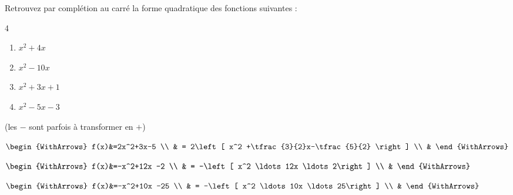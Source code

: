 \documentclass[main.tex]{subfiles}
\begin{document}
\begin{exercise}\label{chapitre01:exercice:completioncarre:01} Retrouvez par complétion au carré la forme quadratique des fonctions suivantes :
\vspace{-1em}
\begin{multicols}{4} 
	\begin{enumerate}[label={$f_\arabic*(x)=$\rule{0pt}{1.8em}}, leftmargin=*] 
		\item $x^2+4x$  
		\item $x^2-10x$  
		\item $x^2+3x+1$  
		\item $x^2-5x-3$  
	\end{enumerate}
\end{multicols} 
\end{exercise}
\begin{example}(les $-$ sont parfois à transformer en $+$)\hfill

\noindent
\parbox{0.35\linewidth}{
	\noindent
	$\begin{WithArrows}
		f(x)&=2x^2+3x-5 \\
		& = 2\left[ x^2 +\tfrac{3}{2}x-\tfrac{5}{2} \right] \\
		&  
	\end{WithArrows}$
}	\hfill 
\parbox{0.35\linewidth}{
	\noindent
	$\begin{WithArrows}
		f(x)&=-x^2+12x -2 \\
		& = -\left[ x^2 \ldots 12x \ldots 2\right]  \\
		&    
	\end{WithArrows}$
}\hfill 
\parbox{0.25\linewidth}{
\noindent
$\begin{WithArrows}
	f(x)&=-x^2+10x -25 \\
	& = -\left[ x^2 \ldots 10x \ldots 25\right]  \\
	&    
\end{WithArrows}$
}
\end{example}
\end{document}
